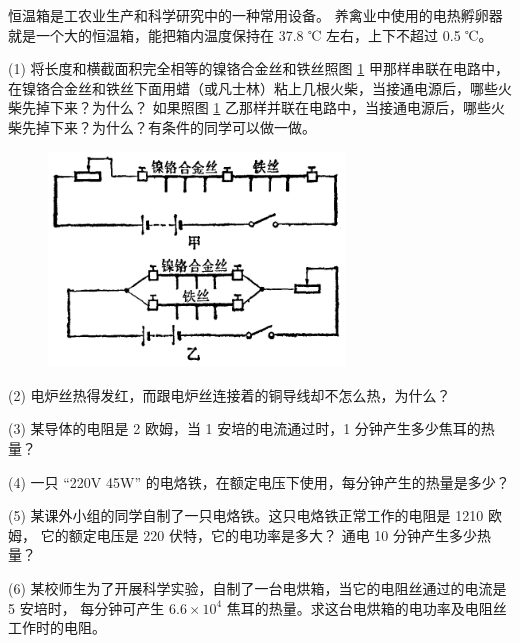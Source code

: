 恒温箱是工农业生产和科学研究中的一种常用设备。
养禽业中使用的电热孵卵器就是一个大的恒温箱，能把箱内温度保持在 37.8 ℃ 左右，上下不超过 0.5 ℃。


\lianxi

(1) 将长度和横截面积完全相等的镍铬合金丝和铁丝照图 \ref{fig:9-8} 甲那样串联在电路中，
在镍铬合金丝和铁丝下面用蜡（或凡士林）粘上几根火柴，当接通电源后，哪些火柴先掉下来？为什么？
如果照图 \ref{fig:9-8} 乙那样并联在电路中，当接通电源后，哪些火柴先掉下来？为什么？有条件的同学可以做一做。

\begin{figure}[htbp]
    \centering
    \includegraphics[width=0.7\textwidth]{../pic/czwl2-ch9-8}
    \caption{}\label{fig:9-8}
\end{figure}

(2) 电炉丝热得发红，而跟电炉丝连接着的铜导线却不怎么热，为什么？

(3) 某导体的电阻是 2 欧姆，当 1 安培的电流通过时，1 分钟产生多少焦耳的热量？

(4) 一只 “220V \; 45W” 的电烙铁，在额定电压下使用，每分钟产生的热量是多少？

(5) 某课外小组的同学自制了一只电烙铁。这只电烙铁正常工作的电阻是 1210 欧姆，
它的额定电压是 220 伏特，它的电功率是多大？ 通电 10 分钟产生多少热量？

(6) 某校师生为了开展科学实验，自制了一台电烘箱，当它的电阻丝通过的电流是 5 安培时，
每分钟可产生 $6.6 \times 10^4$ 焦耳的热量。求这台电烘箱的电功率及电阻丝工作时的电阻。

